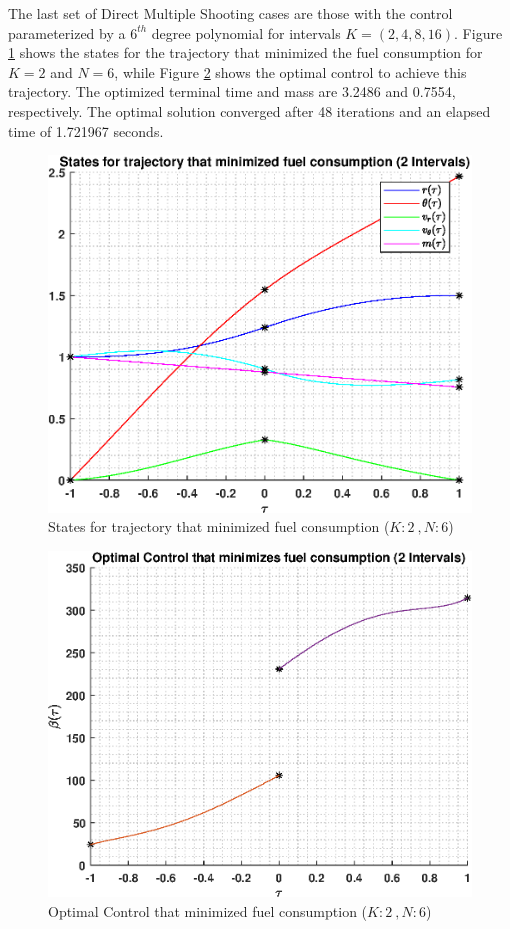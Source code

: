 \documentclass[]{article}
\begin{document}
\FloatBarrier
\noindent
The last set of Direct Multiple Shooting cases are those with the control parameterized by a \(6^{th}\) degree polynomial for intervals \(K = (2,4,8,16)\). Figure \ref{fig:directStatesK2Poly6} shows the states for the trajectory that minimized the fuel consumption for \(K = 2\) and  \(N = 6\), while Figure \ref{fig:directControlK2Poly6} shows the optimal control to achieve this trajectory. The optimized terminal time and mass are 3.2486 and 0.7554, respectively. The optimal solution converged after 48 iterations and an elapsed time of 1.721967 seconds.
\begin{figure}
	\centering
	\includegraphics[scale=0.75]{directStatesK2Poly6.eps}
	\caption{States for trajectory that minimized fuel consumption (\(K:2\ , N:6\))}
	\label{fig:directStatesK2Poly6}
\end{figure}
\begin{figure}
	\centering
	\includegraphics[scale=0.75]{directControlK2Poly6.eps}
	\caption{Optimal Control that minimized fuel consumption (\(K:2\ , N:6\))}
	\label{fig:directControlK2Poly6}
\end{figure}
\end{document}
